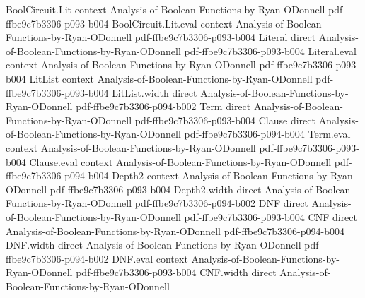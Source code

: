 \begin{lemma}
\leanok
{}
\proofstep
  {BoolCircuit.Lit}
  {context}
  {Analysis-of-Boolean-Functions-by-Ryan-ODonnell}
  {pdf-ffbe9c7b3306-p093-b004}
\proofstep
  {BoolCircuit.Lit.eval}
  {context}
  {Analysis-of-Boolean-Functions-by-Ryan-ODonnell}
  {pdf-ffbe9c7b3306-p093-b004}
\proofstep
  {Literal}
  {direct}
  {Analysis-of-Boolean-Functions-by-Ryan-ODonnell}
  {pdf-ffbe9c7b3306-p093-b004}
\proofstep
  {Literal.eval}
  {context}
  {Analysis-of-Boolean-Functions-by-Ryan-ODonnell}
  {pdf-ffbe9c7b3306-p093-b004}
\proofstep
  {LitList}
  {context}
  {Analysis-of-Boolean-Functions-by-Ryan-ODonnell}
  {pdf-ffbe9c7b3306-p093-b004}
\proofstep
  {LitList.width}
  {direct}
  {Analysis-of-Boolean-Functions-by-Ryan-ODonnell}
  {pdf-ffbe9c7b3306-p094-b002}
\proofstep
  {Term}
  {direct}
  {Analysis-of-Boolean-Functions-by-Ryan-ODonnell}
  {pdf-ffbe9c7b3306-p093-b004}
\proofstep
  {Clause}
  {direct}
  {Analysis-of-Boolean-Functions-by-Ryan-ODonnell}
  {pdf-ffbe9c7b3306-p094-b004}
\proofstep
  {Term.eval}
  {context}
  {Analysis-of-Boolean-Functions-by-Ryan-ODonnell}
  {pdf-ffbe9c7b3306-p093-b004}
\proofstep
  {Clause.eval}
  {context}
  {Analysis-of-Boolean-Functions-by-Ryan-ODonnell}
  {pdf-ffbe9c7b3306-p094-b004}
\proofstep
  {Depth2}
  {context}
  {Analysis-of-Boolean-Functions-by-Ryan-ODonnell}
  {pdf-ffbe9c7b3306-p093-b004}
\proofstep
  {Depth2.width}
  {direct}
  {Analysis-of-Boolean-Functions-by-Ryan-ODonnell}
  {pdf-ffbe9c7b3306-p094-b002}
\proofstep
  {DNF}
  {direct}
  {Analysis-of-Boolean-Functions-by-Ryan-ODonnell}
  {pdf-ffbe9c7b3306-p093-b004}
\proofstep
  {CNF}
  {direct}
  {Analysis-of-Boolean-Functions-by-Ryan-ODonnell}
  {pdf-ffbe9c7b3306-p094-b004}
\proofstep
  {DNF.width}
  {direct}
  {Analysis-of-Boolean-Functions-by-Ryan-ODonnell}
  {pdf-ffbe9c7b3306-p094-b002}
\proofstep
  {DNF.eval}
  {context}
  {Analysis-of-Boolean-Functions-by-Ryan-ODonnell}
  {pdf-ffbe9c7b3306-p093-b004}
\proofstep
  {CNF.width}
  {direct}
  {Analysis-of-Boolean-Functions-by-Ryan-ODonnell}

\end{lemma}
